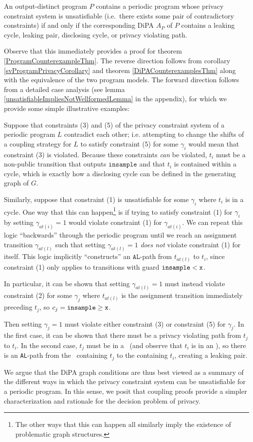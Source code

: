 \begin{thm}
    An output-distinct program $P$ contains a periodic program whose privacy constraint system is unsatisfiable (i.e.\ there exists some pair of contradictory constraints) if and only if the corresponding DiPA $A_P$ of $P$ contains a leaking cycle, leaking pair, disclosing cycle, or privacy violating path.
\end{thm}

Observe that this immediately provides a proof for theorem \ref{ProgramCounterexampleThm}. The reverse direction follows from corollary \ref{svProgramPrivacyCorollary} and theorem \ref{DiPACounterexamplesThm} along with the equivalence of the two program models.
The forward direction follows from a detailed case analysis (see lemma \ref{unsatisfiableImpliesNotWellformedLemma} in the appendix), for which we provide some simple illustrative examples:

Suppose that constraints (3) and (5) of the privacy constraint system of a periodic program $L$ contradict each other; i.e. attempting to change the shifts of a coupling strategy for $L$ to satisfy constraint (5) for some $\gamma_i$ would mean that constraint (3) is violated. 
Because these constraints \textit{can} be violated, $t_i$ must be a non-public transition that outputs $\texttt{insample}$ and that $t_i$ is contained within a cycle, which is exactly how a disclosing cycle can be defined in the generating graph of $G$. 

Similarly, suppose that constraint (1) is unsatisfiable for some $\gamma_i$ where $t_i$ is in a cycle. 
One way that this can happen\footnote{The other ways that this can happen all similarly imply the existence of problematic graph structures.} is if trying to satisfy constraint (1) for $\gamma_i$ by setting $\gamma_{at(i)} = 1$ would violate constraint (1) for $\gamma_{at(i)}$. We can repeat this logic ``backwards'' through the periodic program until we reach an assignment transition $\gamma_{at(l)}$ such that setting $\gamma_{at(l)}=1$ \textit{does not} violate constraint (1) for itself. 
This logic implicitly ``constructs'' an $\texttt{AL}$-path from $t_{at(l)}$ to $t_i$, since constraint (1) only applies to transitions with guard $\lguard[\texttt{x}]$. 

In particular, it can be shown that setting $\gamma_{at(l)}=1$ must instead violate constraint (2) for some $\gamma_j$ where $t_{at(l)}$ is the assignment transition immediately preceding $t_j$, so $c_j = \gguard[\texttt{x}]$. 

Then setting $\gamma_{j}= 1$ must violate either constraint (3) or constraint (5) for $\gamma_{j}$. In the first case, it can be shown that there must be a privacy violating path from $t_j$ to $t_i$. In the second case, $t_{j}$ must be in a \gcycle~(and observe that $t_i$ is in an \lcycle), so there is an \texttt{AL}-path from the \gcycle~containing $t_j$ to the \lcycle containing $t_i$, creating a leaking pair. 

We argue that the DiPA graph conditions are thus best viewed as a summary of the different ways in which the privacy constraint system can be unsatisfiable for a periodic program. In this sense, we posit that coupling proofs provide a simpler characterization and rationale for the decision problem of privacy. 
